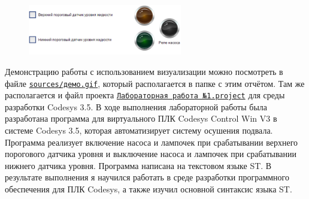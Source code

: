 \documentclass[a4paper]{article}
\begin{document}
\begin{figure}[H]
    \centering
    \includegraphics[width=0.6\textwidth]{sources/визуализация.png}
\end{figure}
Демонстрацию работы с использованием визуализации можно посмотреть в файле \href{run:sources/демо.gif}{\texttt{sources/демо.gif}}, который располагается в папке с этим отчётом. Там же располагается и файл проекта \href{run:sources}{\texttt{Лабораторная работа №1.project}} для среды разработки Codesys 3.5.
В ходе выполнения лабораторной работы была разработана программа для виртуального ПЛК Codesys Control Win V3 в системе Codesys 3.5, которая автоматизирует систему осушения подвала. Программа реализует включение насоса и лампочек при срабатывании верхнего порогового датчика уровня и выключение насоса и лампочек при срабатывании нижнего датчика уровня. Программа написана на текстовом языке ST. В результате выполнения я научился работать в среде разработки программного обеспечения для ПЛК Codesys, а также изучил основной синтаксис языка ST.
\end{document}
